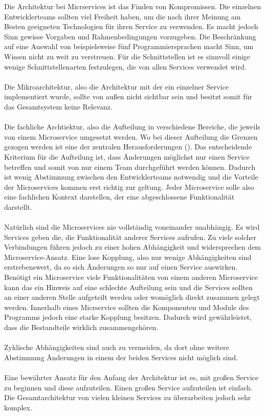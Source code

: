 Die Architektur bei Micrservices ist das Finden von Kompromissen. Die einzelnen Entwicklerteams sollten viel Freiheit haben, um die nach ihrer Meinung am Besten geeigneten Technologien für ihren Service zu verwenden. Es macht jedoch Sinn gewisse Vorgaben und Rahmenbedingungen vorzugeben. Die Beschränkung auf eine Auswahl von beispielsweise fünf Programmiersprachen macht Sinn, um Wissen nicht zu weit zu verstreuen. Für die Schnittstellen ist es sinnvoll einige wenige Schnittstellenarten festzulegen, die von allen Services verwendet wird.  \\
\\
Die Mikroarchitektur, also die Architektur mit der ein einzelner Service implementiert wurde, sollte von außen nicht sichtbar sein und besitzt somit für das Gesamtsystem keine Relevanz. \\
\\
Die fachliche Archtiektur, also die Aufteilung in verschiedene Bereiche, die jeweils von einem Microservice umgesetzt werden. Wo bei dieser Aufteilung die Grenzen gezogen werden ist eine der zentralen Herausforderungen (\cite[S. 102]{wolffMicroservices2018}). Das entscheidende Kriterium für die Aufteilung ist, dass Änderungen möglichst nur einen Service betreffen und somit von nur einem Team durchgeführt werden können. Dadurch ist wenig Abstimmung zwischen den Entwicklerteams notwendig und die Vorteile der Microservices kommen erst richtig zur geltung. Jeder Microservice solle also eine fachlichen Kontext darstellen, der eine abgeschlossene Funktionalität darstellt. \\
\\
Natürlich sind die Microservices nie vollständig voneinander unabhängig. Es wird Services geben die, die Funktionalität anderer Services aufrufen. Zu viele solcher Verbindungen führen jedoch zu einer hohen Abhängigkeit und widersprechen dem Microservice-Ansatz. Eine lose Kopplung, also nur wenige Abhängigkeiten sind erstrebenswert, da so sich Änderungen so nur auf einen Service auswirken. Benötigt ein Microservice viele Funktionalitäten von einem anderen Microservice kann das ein Hinweis auf eine schlechte Aufteilung sein und die Services sollten an einer anderen Stelle aufgeteilt werden oder womöglich direkt zusammen gelegt werden. Innerhalb eines Micrservice sollten die Komponenten und Module des Programms jedoch eine starke Kopplung besitzen. Dadurch wird gewährleistet, dass die Bestandteile wirklich zusammengehören. \\
\\
Zyklische Abhängigkeiten sind auch zu vermeiden, da dort ohne weitere Abstimmung Änderungen in einem der beiden Services nicht möglich sind. \\
\\
Eine bewährter Ansatz für den Anfang der Architektur ist es, mit großen Service zu beginnen und diese aufzuteilen. Einen großen Service aufzuteilen ist einfach. Die Gesamtarchitektur von vielen kleinen Services zu überarbeiten jedoch sehr komplex. \\

